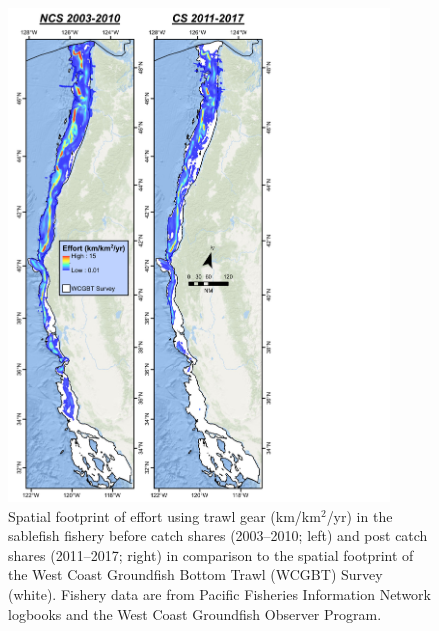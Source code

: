 \documentclass[11pt,
  english,
  a4paper,
]{article}
\begin{document}
\tagmcend\tagstructend


\begin{figure}
\centering
\includegraphics[width=0.9\textwidth,height=0.9\textheight]{figs/Sablefish_Figures_TWL_lnDens_2views_avg_crop.pdf}
\caption{Spatial footprint of effort using trawl gear (km/km{\(^2\)\leavevmode\tagmcend\tagstructend}/yr) in the sablefish fishery before catch shares (2003--2010; left) and post catch shares (2011--2017; right) in comparison to the spatial footprint of the West Coast Groundfish Bottom Trawl (WCGBT) Survey (white). Fishery data are from Pacific Fisheries Information Network logbooks and the West Coast Groundfish Observer Program.\label{fig:footprinttwl}}
\end{figure}

\tagmcend\tagstructend

\end{document}
